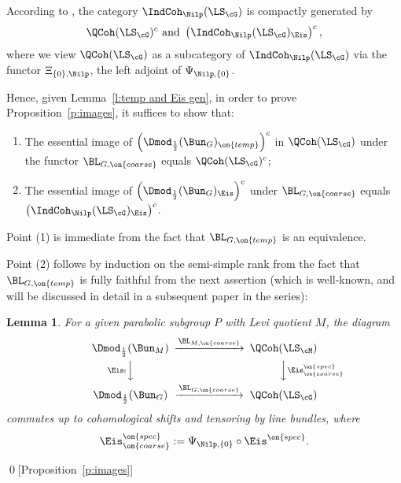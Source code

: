 \documentclass[9pt]{amsart}
\newtheorem{lem}[subsubsection]{Lemma}
\theoremstyle{remark}
\theoremstyle{definition}
\theoremstyle{remark}
\newcommand{\lemref}[1]{Lemma~\ref{#1}}
\newcommand{\propref}[1]{Proposition~\ref{#1}}
\numberwithin{equation}{section}
\begin{document}
\medskip

According to \cite[Theorem 13.3.6]{AG}, the category $\IndCoh_\Nilp(\LS_\cG)$ is compactly generated by
$$\QCoh(\LS_\cG)^c \text{ and } \left(\IndCoh_\Nilp(\LS_\cG)_{\Eis}\right)^c,$$
where we view $\QCoh(\LS_\cG)$ as a subcategory of $\IndCoh_\Nilp(\LS_\cG)$ via the functor
$\Xi_{\{0\},\Nilp}$, the left adjoint of $\Psi_{\Nilp,\{0\}}$. 

\medskip

Hence, given \lemref{l:temp and Eis gen}, in order to prove \propref{p:images}, it suffices to show that:

\begin{enumerate}

\item The essential image of $\left(\Dmod_{\frac{1}{2}}(\Bun_G)_{\on{temp}}\right)^c$ in $\QCoh(\LS_\cG)$ under 
the functor $\BL_{G,\on{coarse}}$ equals $\QCoh(\LS_\cG)^c$;

\item  The essential image of $\left(\Dmod_{\frac{1}{2}}(\Bun_G)_{\Eis}\right)^c$  under 
$\BL_{G,\on{coarse}}$ equals $\left(\IndCoh_\Nilp(\LS_\cG)_{\Eis}\right)^c$.

\end{enumerate} 

\sssec{}

Point (1) is immediate from the fact that $\BL_{G,\on{temp}}$ is an equivalence. 

\medskip

Point (2) follows by induction on the semi-simple rank from the fact that $\BL_{G,\on{temp}}$ is 
fully faithful from the next assertion (which is well-known, and will be discussed in detail in a subsequent paper in the series):

\medskip

\begin{lem} \label{l:Eis}
For a given parabolic subgroup $P$ with Levi quotient $M$, the diagram
$$
\CD 
\Dmod_{\frac{1}{2}}(\Bun_M) @>{\BL_{M,\on{coarse}}}>> \QCoh(\LS_\cM) \\
@V{\Eis_!}VV @VV{\Eis^{\on{spec}}_{\on{coarse}}}V \\
\Dmod_{\frac{1}{2}}(\Bun_G) @>{\BL_{G,\on{coarse}}}>> \QCoh(\LS_\cG)
\endCD
$$
commutes up to cohomological shifts and tensoring by line bundles, where
$$\Eis^{\on{spec}}_{\on{coarse}}:= \Psi_{\Nilp,\{0\}}\circ \Eis^{\on{spec}}.$$
\end{lem}

\qed[\propref{p:images}]
\end{document}
